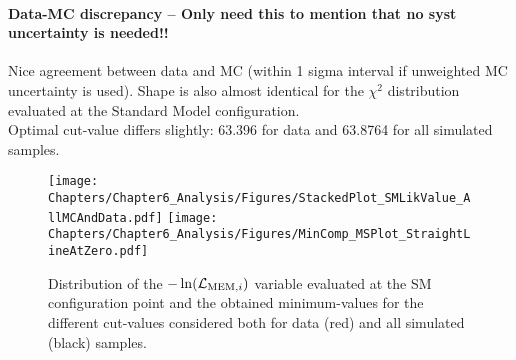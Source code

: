 \paragraph{Data-MC discrepancy -- Only need this to mention that no syst uncertainty is needed!!}
Nice agreement between data and MC (within 1 sigma interval if unweighted MC uncertainty is used). 
Shape is also almost identical for the $\chi^{2}$ distribution evaluated at the Standard Model configuration.\\
Optimal cut-value differs slightly: 63.396 for data and 63.8764 for all simulated samples.

\begin{figure}[h!t]
 \centering
 \texttt{[image: Chapters/Chapter6\_Analysis/Figures/StackedPlot\_SMLikValue\_AllMCAndData.pdf]}
 \texttt{[image: Chapters/Chapter6\_Analysis/Figures/MinComp\_MSPlot\_StraightLineAtZero.pdf]}            %
 \caption{Distribution of the $-\ln(\mathcal{L}_{\textrm{MEM}, i})$ variable evaluated at the SM configuration point and the obtained minimum-values for the different cut-values considered both for data (red) and all simulated (black) samples.}
\end{figure}

